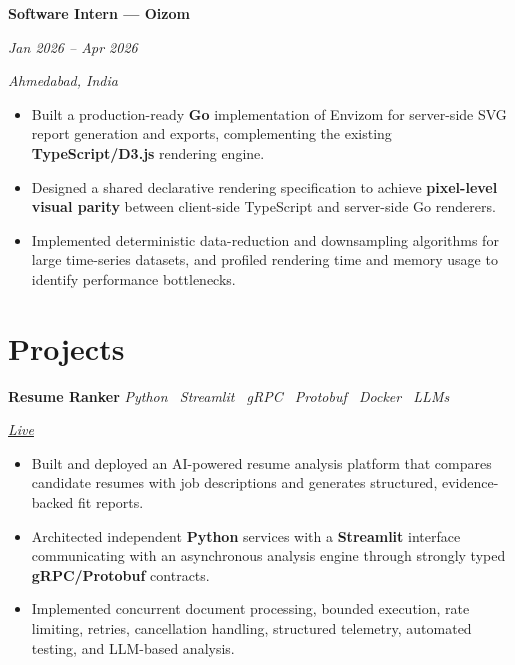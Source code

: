 \documentclass[10pt,a4paper]{article}
\newcommand{\datedentry}[2]{%
    \noindent
    \begin{minipage}[t]{0.72\linewidth}
        \raggedright
        \textbf{#1}
    \end{minipage}%
    \hfill
    \begin{minipage}[t]{0.25\linewidth}
        \raggedleft
        \textit{\color{textgray}#2}
    \end{minipage}%
    \par
}
\newcommand{\projectentry}[3]{%
    \noindent
    \begin{minipage}[t]{0.62\linewidth}
        \raggedright
        \textbf{#1}
        \hspace{0.7em}
        \textit{\color{textgray}#2}
    \end{minipage}%
    \hfill
    \begin{minipage}[t]{0.34\linewidth}
        \raggedleft
        \itshape\color{textgray}#3
    \end{minipage}%
    \par
}
\begin{document}
\datedentry
    {Software Intern --- Oizom}
    {Jan 2026 -- Apr 2026}

\vspace{1.5pt}

{\fontsize{10}{12}\selectfont
\itshape\color{textgray}
Ahmedabad, India
}

\vspace{2pt}

\begin{itemize}
    \item Built a production-ready \textbf{Go} implementation of Envizom for server-side SVG report generation and exports, complementing the existing \textbf{TypeScript/D3.js} rendering engine.

    \item Designed a shared declarative rendering specification to achieve \textbf{pixel-level visual parity} between client-side TypeScript and server-side Go renderers.

    \item Implemented deterministic data-reduction and downsampling algorithms for large time-series datasets, and profiled rendering time and memory usage to identify performance bottlenecks.
\end{itemize}

\section*{Projects}

\projectentry
    {Resume Ranker}
    {Python \textperiodcentered\ Streamlit \textperiodcentered\ gRPC \textperiodcentered\ Protobuf \textperiodcentered\ Docker \textperiodcentered\ LLMs}
    {\href{https://resumeranker.kishanthanki.space/}{Live}}

\vspace{2pt}

\begin{itemize}
    \item Built and deployed an AI-powered resume analysis platform that compares candidate resumes with job descriptions and generates structured, evidence-backed fit reports.

    \item Architected independent \textbf{Python} services with a \textbf{Streamlit} interface communicating with an asynchronous analysis engine through strongly typed \textbf{gRPC/Protobuf} contracts.

    \item Implemented concurrent document processing, bounded execution, rate limiting, retries, cancellation handling, structured telemetry, automated testing, and LLM-based analysis.
\end{itemize}
\end{document}

